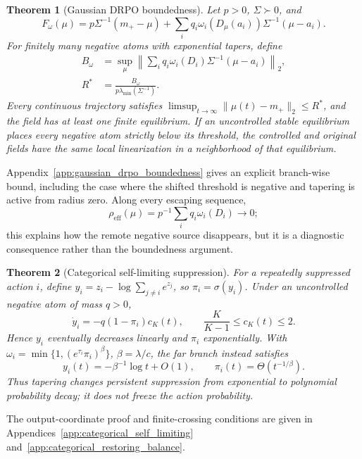 \documentclass{article}
\theoremstyle{plain}
\newtheorem{theorem}{Theorem}[section]
\theoremstyle{definition}
\theoremstyle{remark}
\begin{document}
\begin{theorem}[Gaussian DRPO boundedness]
\label{thm:gaussian_drpo_boundedness}
Let \(p>0\), \(\Sigma\succ0\), and
\[
F_\omega(\mu)=p\Sigma^{-1}(m_+-\mu)
+\sum_iq_i\omega_i(D_\mu(a_i))\Sigma^{-1}(\mu-a_i).
\]
For finitely many negative atoms with exponential tapers, define
\begin{equation}
\begin{aligned}
B_\omega&=\sup_\mu\left\|\sum_iq_i\omega_i(D_i)
\Sigma^{-1}(\mu-a_i)\right\|_2,\\
R^*&=\frac{B_\omega}{p\lambda_{\min}(\Sigma^{-1})}.
\end{aligned}
\label{eq:gaussian_bound_radius}
\end{equation}
Every continuous trajectory satisfies
\(\limsup_{t\to\infty}\|\mu(t)-m_+\|_2\le R^*\), and the field has at
least one finite equilibrium. If an uncontrolled stable equilibrium
places every negative atom strictly below its threshold, the controlled
and original fields have the same local linearization in a neighborhood of
that equilibrium.
\end{theorem}

Appendix~\ref{app:gaussian_drpo_boundedness} gives an explicit
branch-wise bound, including the case where the shifted threshold is
negative and tapering is active from radius zero. Along every escaping
sequence,
\[
\rho_{\mathrm{eff}}(\mu)
=
p^{-1}\sum_i q_i\omega_i(D_i)
\longrightarrow 0;
\]
this explains how the remote negative source disappears, but it is a
diagnostic consequence rather than the boundedness argument.

\begin{theorem}[Categorical self-limiting suppression]
\label{thm:categorical_self_limiting}
For a repeatedly suppressed action \(i\), define
\(y_i=z_i-\log\sum_{j\ne i}e^{z_j}\), so \(\pi_i=\sigma(y_i)\).
Under an uncontrolled negative atom of mass \(q>0\),
\[
\dot y_i=-q(1-\pi_i)c_K(t),
\qquad \frac K{K-1}\le c_K(t)\le2.
\]
Hence \(y_i\) eventually decreases linearly and \(\pi_i\) exponentially.
With \(\omega_i=\min\{1,(e^{\tau_i}\pi_i)^\beta\}\),
\(\beta=\lambda/c\), the far branch instead satisfies
\[
y_i(t)=-\beta^{-1}\log t+O(1),
\qquad \pi_i(t)=\Theta(t^{-1/\beta}).
\]
Thus tapering changes persistent suppression from exponential to
polynomial probability decay; it does not freeze the action probability.
\end{theorem}

The output-coordinate proof and finite-crossing conditions are given in
Appendices~\ref{app:categorical_self_limiting}
and~\ref{app:categorical_restoring_balance}.
\end{document}
